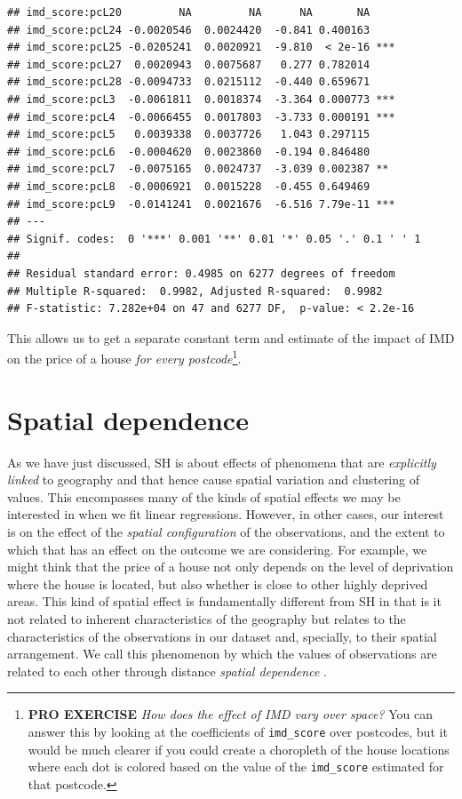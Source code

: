\documentclass[
]{book}
\begin{document}
\begin{verbatim}
## imd_score:pcL20         NA         NA      NA       NA    
## imd_score:pcL24 -0.0020546  0.0024420  -0.841 0.400163    
## imd_score:pcL25 -0.0205241  0.0020921  -9.810  < 2e-16 ***
## imd_score:pcL27  0.0020943  0.0075687   0.277 0.782014    
## imd_score:pcL28 -0.0094733  0.0215112  -0.440 0.659671    
## imd_score:pcL3  -0.0061811  0.0018374  -3.364 0.000773 ***
## imd_score:pcL4  -0.0066455  0.0017803  -3.733 0.000191 ***
## imd_score:pcL5   0.0039338  0.0037726   1.043 0.297115    
## imd_score:pcL6  -0.0004620  0.0023860  -0.194 0.846480    
## imd_score:pcL7  -0.0075165  0.0024737  -3.039 0.002387 ** 
## imd_score:pcL8  -0.0006921  0.0015228  -0.455 0.649469    
## imd_score:pcL9  -0.0141241  0.0021676  -6.516 7.79e-11 ***
## ---
## Signif. codes:  0 '***' 0.001 '**' 0.01 '*' 0.05 '.' 0.1 ' ' 1
## 
## Residual standard error: 0.4985 on 6277 degrees of freedom
## Multiple R-squared:  0.9982, Adjusted R-squared:  0.9982 
## F-statistic: 7.282e+04 on 47 and 6277 DF,  p-value: < 2.2e-16
\end{verbatim}

This allows us to get a separate constant term and estimate of the impact of IMD on the price of a house \emph{for every postcode}\footnote{\textbf{PRO EXERCISE} \emph{How does the effect of IMD vary over space?} You can answer this by looking at the coefficients of \texttt{imd\_score} over postcodes, but it would be much clearer if you could create a choropleth of the house locations where each dot is colored based on the value of the \texttt{imd\_score} estimated for that postcode.}.

\hypertarget{spatial-dependence}{%
\section{Spatial dependence}\label{spatial-dependence}}

As we have just discussed, SH is about effects of phenomena that are \emph{explicitly linked} to geography and that hence cause spatial variation and clustering of values. This encompasses many of the kinds of spatial effects we may be interested in when we fit linear regressions. However, in other cases, our interest is on the effect of the \emph{spatial configuration} of the observations, and the extent to which that has an effect on the outcome we are considering. For example, we might think that the price of a house not only depends on the level of deprivation where the house is located, but also whether is close to other highly deprived areas. This kind of spatial effect is fundamentally different from SH in that is it not related to inherent characteristics of the geography but relates to the characteristics of the observations in our dataset and, specially, to their spatial arrangement. We call this phenomenon by which the values of observations are related to each other through distance \emph{spatial dependence} \citep{anselin1988spatial}.
\end{document}
